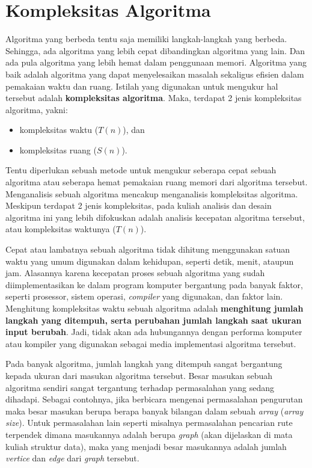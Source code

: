 \section{Kompleksitas Algoritma}
Algoritma yang berbeda tentu saja memiliki langkah-langkah yang berbeda. Sehingga, ada algoritma yang lebih cepat dibandingkan algoritma yang lain. Dan ada pula algoritma yang lebih hemat dalam penggunaan memori. Algoritma yang baik adalah algoritma yang dapat menyelesaikan masalah  sekaligus efisien dalam pemakaian waktu dan ruang. Istilah yang digunakan untuk mengukur hal tersebut adalah \textbf{kompleksitas algoritma}. Maka, terdapat 2 jenis kompleksitas algoritma, yakni:

\begin{itemize}
    \item kompleksitas waktu ($T(n)$), dan
    \item kompleksitas ruang ($S(n)$).
\end{itemize}

Tentu diperlukan sebuah metode untuk mengukur seberapa cepat sebuah algoritma atau seberapa hemat pemakaian ruang memori dari algoritma tersebut. Menganalisis sebuah algoritma mencakup menganalisis kompleksitas algoritma. Meskipun terdapat 2 jenis kompleksitas, pada kuliah analisis dan desain algoritma ini yang lebih difokuskan adalah analisis kecepatan algoritma tersebut, atau kompleksitas waktunya ($T(n)$).

Cepat atau lambatnya sebuah algoritma tidak dihitung menggunakan satuan waktu yang umum digunakan dalam kehidupan, seperti detik, menit, ataupun jam. Alasannya karena kecepatan proses sebuah algoritma yang sudah diimplementasikan ke dalam program komputer bergantung pada banyak faktor, seperti prosessor, sistem operasi, \textit{compiler} yang digunakan, dan faktor lain. Menghitung kompleksitas waktu sebuah algoritma adalah \textbf{menghitung jumlah langkah yang ditempuh, serta perubahan jumlah langkah saat ukuran input berubah}. Jadi, tidak akan ada hubungannya dengan performa komputer atau kompiler yang digunakan sebagai media implementasi algoritma tersebut.

Pada banyak algoritma, jumlah langkah yang ditempuh sangat bergantung kepada ukuran dari masukan algoritma tersebut. Besar masukan sebuah algoritma sendiri sangat tergantung terhadap permasalahan yang sedang dihadapi. Sebagai contohnya, jika berbicara mengenai permasalahan pengurutan maka besar masukan berupa berapa banyak bilangan dalam sebuah \textit{array} (\textit{array size}). Untuk permasalahan lain seperti misalnya permasalahan pencarian rute terpendek dimana masukannya adalah berupa \textit{graph} (akan dijelaskan di mata kuliah struktur data), maka yang menjadi besar masukannya adalah jumlah \textit{vertice} dan \textit{edge} dari \textit{graph} tersebut. 


